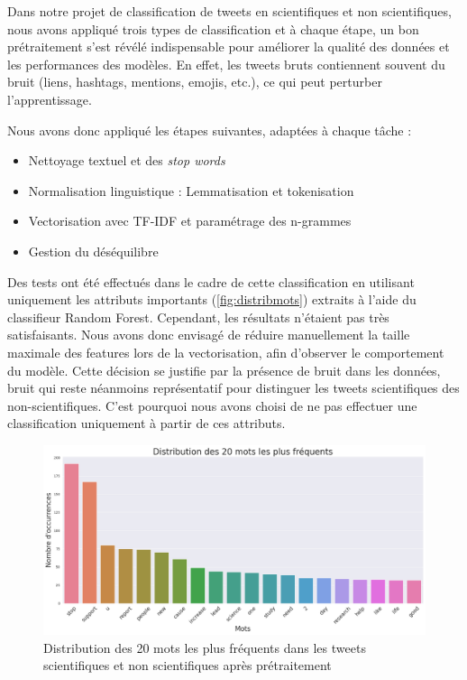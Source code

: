 Dans notre projet de classification de tweets en scientifiques et non scientifiques, nous avons appliqué trois types de classification et à chaque étape, un bon prétraitement s’est révélé indispensable pour améliorer la qualité des données et les performances des modèles.
En effet, les tweets bruts contiennent souvent du bruit (liens, hashtags, mentions, emojis, etc.), ce qui peut perturber l’apprentissage.

Nous avons donc appliqué les étapes suivantes, adaptées à chaque tâche :
\begin{itemize}
    \item Nettoyage textuel et des \textit{stop words}
    \item Normalisation linguistique : Lemmatisation et tokenisation
    \item Vectorisation avec TF-IDF et paramétrage des n-grammes
    \item Gestion du déséquilibre
\end{itemize}

Des tests ont été effectués dans le cadre de cette classification en utilisant uniquement les attributs importants (\autoref{fig:distribmots}) extraits à l’aide du classifieur Random Forest.
Cependant, les résultats n’étaient pas très satisfaisants.
Nous avons donc envisagé de réduire manuellement la taille maximale des features lors de la vectorisation, afin d’observer le comportement du modèle.
Cette décision se justifie par la présence de bruit dans les données, bruit qui reste néanmoins représentatif pour distinguer les tweets scientifiques des non-scientifiques.
C’est pourquoi nous avons choisi de ne pas effectuer une classification uniquement à partir de ces attributs.

\begin{figure}[H]
    \centering
    \includegraphics[width=\textwidth]{images/distribmots}
    \caption{Distribution des 20 mots les plus fréquents dans les tweets scientifiques et non scientifiques après prétraitement}
    \label{fig:distribmots}
\end{figure}

